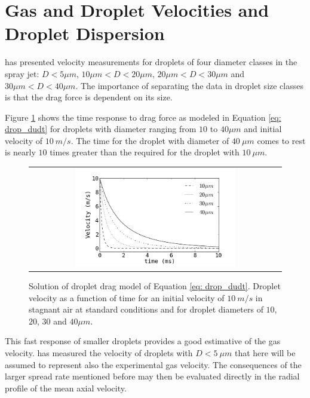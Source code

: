 \FloatBarrier
\section{Gas and Droplet Velocities and Droplet Dispersion}

\cite{chen} has presented velocity measurements for droplets of four diameter classes in the spray jet: $D< 5\mu m$, $10\mu m <D<20\mu m$, $20 \mu m < D < 30 \mu m$ and $30 \mu m < D < 40 \mu m$. The importance of separating the data in droplet size classes is that the drag force is dependent on its size. 

Figure \ref{fig: drop_drag} shows the time response to drag force as modeled in Equation \eqref{eq: drop_dudt} for droplets with diameter ranging from $10$ to $40\mu m$ and initial velocity of $10\ m/s$. The time for the droplet with diameter of $40\ \mu m$ comes to rest is nearly $10$ times greater than the required for the droplet with $10\ \mu m$.

\begin{figure}
 \centering
\begin{tabular}{c}
 \includegraphics[width=0.65\textwidth]{./figuras/chap5/drag/drop_drag.png}
\end{tabular}
 \caption{Solution of droplet drag model of Equation \eqref{eq: drop_dudt}. Droplet velocity as a function of time for an initial velocity of $10\ m/s$ in stagnant air at standard conditions and for droplet diameters of $10$, $20$, $30$ and $40 \mu m$. }
 \label{fig: drop_drag}
\end{figure}


This fast response of smaller droplets provides a good estimative of the gas velocity. \cite{chen} has measured the velocity of droplets with $D< 5\ \mu m$ that here will be assumed to represent also the experimental gas velocity. The consequences of the larger spread rate mentioned before may then be evaluated directly in the radial profile of the mean axial velocity.

